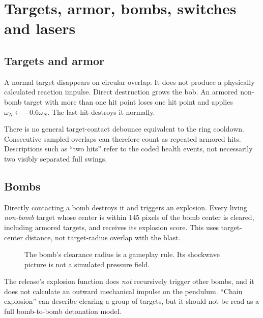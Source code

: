\documentclass[11pt,a4paper]{article}
\begin{document}
\section{Targets, armor, bombs, switches and lasers}
\subsection{Targets and armor}
A normal target disappears on circular overlap. It does not produce a physically calculated reaction impulse. Direct destruction grows the bob. An armored non-bomb target with more than one hit point loses one hit point and applies \(\omega_N\leftarrow-0.6\omega_N\). The last hit destroys it normally.

There is no general target-contact debounce equivalent to the ring cooldown. Consecutive sampled overlaps can therefore count as repeated armored hits. Descriptions such as ``two hits'' refer to the coded health events, not necessarily two visibly separated full swings.
\subsection{Bombs}
Directly contacting a bomb destroys it and triggers an explosion. Every living \emph{non-bomb} target whose center is within 145 pixels of the bomb center is cleared, including armored targets, and receives its explosion score. This uses target-center distance, not target-radius overlap with the blast.
\begin{figure}[H]\centering
{}\caption{The bomb's clearance radius is a gameplay rule. Its shockwave picture is not a simulated pressure field.}
\end{figure}
The release's explosion function does \emph{not} recursively trigger other bombs, and it does not calculate an outward mechanical impulse on the pendulum. ``Chain explosion'' can describe clearing a group of targets, but it should not be read as a full bomb-to-bomb detonation model.
\end{document}
